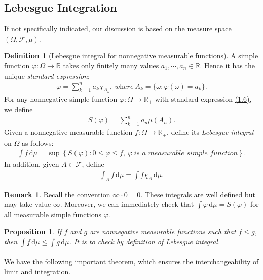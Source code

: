 \documentclass{article}
\numberwithin{equation}{section}
\renewcommand{\d}{\mathrm{d}}
\theoremstyle{plain}
\newtheorem{proposition}[theorem]{Proposition}
\theoremstyle{definition}
\newtheorem{definition}[theorem]{Definition}
\newtheorem*{remark}{Remark}
\begin{document}
\subsection{Lebesgue Integration}
If not specifically indicated, our discussion is based on the measure space $(\Omega,\mathscr{F},\mu)$.
\begin{definition}[Lebesgue integral for nonnegative measurable functions]\label{def:1.38} 
A simple function $\varphi:\Omega\to\mathbb{R}$ takes only finitely many values $a_1,\cdots,a_n\in\mathbb{R}$. Hence it has the unique \textit{standard expression}:
\begin{align*}
	\varphi=\sum_{k=1}^n a_k\chi_{A_k},\ \textit{where}\ A_k=\{\omega:\varphi(\omega)=a_k\}. \tag{1.6}\label{eq:1.6}
\end{align*}
For any nonnegative simple function $\varphi:\Omega\to\mathbb{R}_+$ with standard expression \hyperref[eq:1.6]{(1.6)}, we define
\begin{align*}
	S(\varphi) = \sum_{k=1}^n a_n\mu(A_n).
\end{align*}
Given a nonnegative measurable function $f:\Omega\to\overline{\mathbb{R}}_+$, define its \textit{Lebesgue integral} on $\Omega$ as follows:
\begin{align*}
	\int f\,\d\mu = \sup\left\{S(\varphi):0\leq\varphi\leq f,\ \varphi\ \textit{is a measurable simple function}\right\}.
\end{align*}
In addition, given $A\in\mathscr{F}$, define
\begin{align*}
	\int_A f\,\d\mu = \int f\chi_A\,\d\mu.
\end{align*}
\end{definition}
\begin{remark} Recall the convention $\infty\cdot 0=0$. These integrals are well defined but may take value $\infty$. Moreover, we can immediately check that $\int\varphi\,\d\mu=S(\varphi)$ for all measurable simple functions $\varphi$.
\end{remark}

\begin{proposition}\label{prop:1.39} If $f$ and $g$ are nonnegative measurable functions such that $f\leq g$, then $\int f\,\d\mu\leq\int g\,\d\mu$. It is to check by definition of Lebesgue integral.
\end{proposition}

\paragraph{} We have the following important theorem, which ensures the interchangeability of limit and integration.
\end{document}
